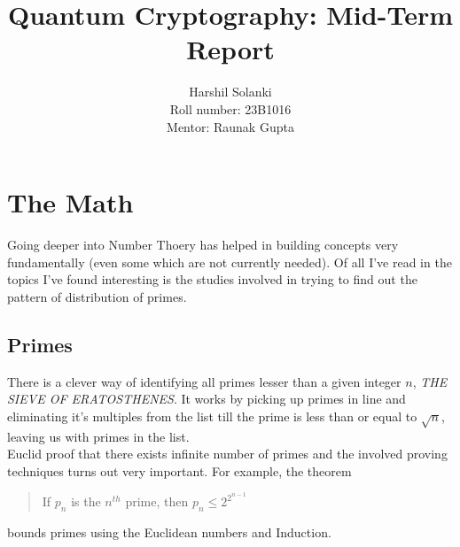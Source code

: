 \documentclass{article}
\begin{document}
\title{Quantum Cryptography: Mid-Term Report}
\author{Harshil Solanki\\Roll number: 23B1016\\Mentor: Raunak Gupta}
\maketitle
\tableofcontents
\clearpage

\section{The Math}
Going deeper into Number Thoery has helped in building concepts very fundamentally (even some which are not currently needed). Of all I've read in \cite{numt} the topics I've found interesting is the studies involved in trying to find out the pattern of distribution of primes.

\subsection{Primes}
There is a clever way of identifying all primes lesser than a given integer $n$, {\it THE SIEVE OF ERATOSTHENES}. It works by picking up primes in line and eliminating it's multiples from the list till the prime is less than or equal to $\sqrt{n}$, leaving us with primes in the list.\\
Euclid proof that there exists infinite number of primes and the involved proving techniques turns out very important. For example, the theorem 
\begin{quote}
    If $p_n$ is the $n^{th}$ prime, then $p_n \leq 2^{2^{n-1}}$
\end{quote}
bounds primes using the Euclidean numbers and Induction.
\end{document}
